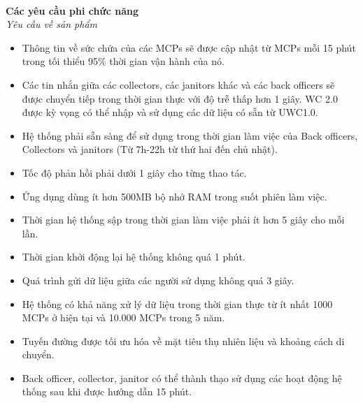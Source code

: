 \documentclass[a4paper]{article}
\begin{document}
\\
\textbf{Các yêu cầu phi chức năng}
\\
\textit{ Yêu cầu về sản phẩm}
\begin{itemize}


\item Thông tin về sức chứa của các MCPs sẽ được cập nhật từ MCPs mỗi 15 phút trong tối thiểu 95\% thời gian vận hành của nó.
\item Các tin nhắn giữa các collectors, các janitors khác và các back officers sẽ được chuyển tiếp trong thời gian thực với độ trễ thấp hơn 1 giây.
\itemU WC 2.0 được kỳ vọng có thể nhập và sử dụng các dữ liệu có sẵn từ UWC1.0.
\item Hệ thống phải sẵn sàng để sử dụng trong thời gian làm việc của Back officers, Collectors và janitors (Từ 7h-22h từ thứ hai đến chủ nhật).
\item Tốc độ phản hồi phải dưới 1 giây cho từng thao tác.
\item Ứng dụng dùng ít hơn 500MB bộ nhớ RAM trong suốt phiên làm việc.
\item Thời gian hệ thống sập trong thời gian làm việc phải ít hơn 5 giây cho mỗi lần.
\item Thời gian khởi động lại hệ thống không quá 1 phút.
\item Quá trình gửi dữ liệu giữa các người sử dụng không quá 3 giây.

\item Hệ thống có khả năng xử lý dữ liệu trong thời gian thực từ ít nhất 1000 MCPs ở hiện tại và 10.000 MCPs trong 5 năm.
\item Tuyến đường được tối ưu hóa về mặt tiêu thụ nhiên liệu và khoảng cách di chuyển.
\item Back officer, collector, janitor có thể thành thạo sử dụng các hoạt động hệ thống sau khi được hướng dẫn 15 phút.
\end{itemize}
\end{document}
